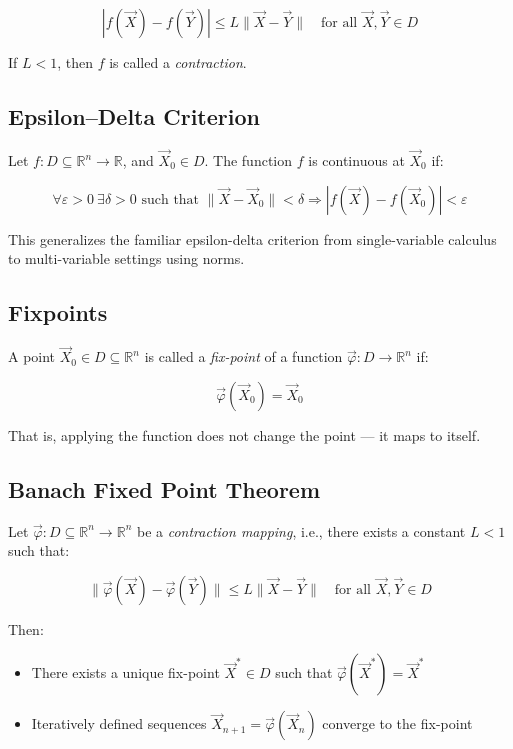 \[
|f(\vec{X}) - f(\vec{Y})| \le L \|\vec{X} - \vec{Y}\| \quad \text{for all } \vec{X}, \vec{Y} \in D
\]

If \( L < 1 \), then \( f \) is called a \emph{contraction}.

\subsection{Epsilon–Delta Criterion}

Let \( f : D \subseteq \mathbb{R}^n \to \mathbb{R} \), and \( \vec{X}_0 \in D \). The function \( f \) is continuous at \( \vec{X}_0 \) if:

\[
\forall \varepsilon > 0 \ \exists \delta > 0 \text{ such that } \|\vec{X} - \vec{X}_0\| < \delta \Rightarrow |f(\vec{X}) - f(\vec{X}_0)| < \varepsilon
\]

This generalizes the familiar epsilon-delta criterion from single-variable calculus to multi-variable settings using norms.

\subsection{Fixpoints}
  
A point \( \vec{X}_0 \in D \subseteq \mathbb{R}^n \) is called a \emph{fix-point} of a function \( \vec{\varphi} : D \to \mathbb{R}^n \) if:

\[
\vec{\varphi}(\vec{X}_0) = \vec{X}_0
\]

That is, applying the function does not change the point — it maps to itself.

\subsection{Banach Fixed Point Theorem}

Let \( \vec{\varphi} : D \subseteq \mathbb{R}^n \to \mathbb{R}^n \) be a \emph{contraction mapping}, i.e., there exists a constant \( L < 1 \) such that:

\[
\|\vec{\varphi}(\vec{X}) - \vec{\varphi}(\vec{Y})\| \le L \|\vec{X} - \vec{Y}\| \quad \text{for all } \vec{X}, \vec{Y} \in D
\]

Then:
\begin{itemize}[label=\(-\)]
\item There exists a unique fix-point \( \vec{X}^* \in D \) such that \( \vec{\varphi}(\vec{X}^*) = \vec{X}^* \)
\item Iteratively defined sequences \( \vec{X}_{n+1} = \vec{\varphi}(\vec{X}_n) \) converge to the fix-point
\end{itemize}

